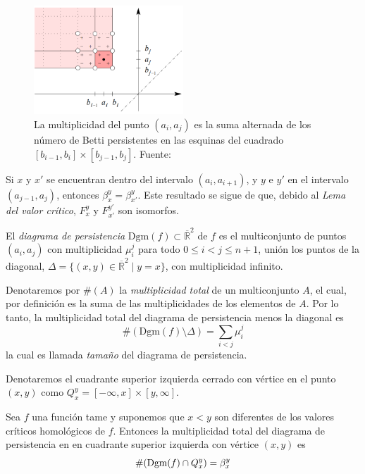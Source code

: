 \begin{figure}[!ht]
\centering
\includegraphics[width=0.5\textwidth]{include/figuras/multiplicidadEsquinas.png} 
\caption{La multiplicidad del punto $(a_i, a_j)$ es la suma alternada de los número de Betti persistentes en las esquinas del cuadrado $[b_{i-1}, b_i]\times[b_{j-1}, b_j]$. Fuente: \cite{Cohen-Steiner2007}}
\label{ref:multiplicidadDiagrama}
\end{figure}

\begin{remark}
Si $x$ y $x'$ se encuentran dentro del intervalo $(a_i, a_{i+1})$, y $y$ e $y'$ en el intervalo $(a_{j-1}, a_j)$, entonces $\beta_{x}^{y} = \beta_{x'}^{y}$. Este resultado se sigue de que, debido al \emph{Lema del valor crítico}, $F_{x}^{y}$ y $F_{x'}^{y'}$ son isomorfos.
\end{remark}

\begin{definition}
El \emph{diagrama de persistencia} $\text{Dgm}(f) \subset \overline{\mathbb{R}}^2$ de $f$ es el multiconjunto de puntos $(a_i, a_j)$ con multiplicidad $\mu_{i}^{j}$ para todo $0 \leq i < j \leq n+1$, unión los puntos de la diagonal, $\Delta=\{(x, y) \in \overline{\mathbb{R}}^2 \mid y = x\}$, con multiplicidad infinito.
\end{definition}

Denotaremos por $\#(A)$ la \emph{multiplicidad total} de un multiconjunto $A$, el cual, por definición es la suma de las multiplicidades de los elementos de $A$. Por lo tanto, la multiplicidad total del diagrama de persistencia menos la diagonal es
\[
\#(\text{Dgm}(f) \setminus \Delta) = \sum_{i < j} \mu_{i}^{j}
\]
la cual es llamada \emph{tamaño} del diagrama de persistencia.

Denotaremos el cuadrante superior izquierda cerrado con vértice en el punto $(x, y)$ como $Q_{x}^{y} = [-\infty, x] \times [y, \infty]$.

\begin{lemma}
Sea $f$ una función tame y suponemos que $x < y$ son diferentes de los valores críticos homológicos de $f$. Entonces la multiplicidad total del diagrama de persistencia en en cuadrante superior izquierda con vértice $(x, y)$ es
\[
\#({\rm Dgm}(f) \cap Q_{x}^{y})= \beta_{x}^{y}
\]
\end{lemma}

